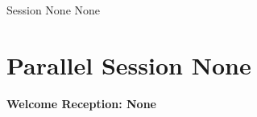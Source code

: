 \clearpage
{}
\begin{ThreeSessionOverview}{Session None}{\daydateyear}
  {None}
\end{ThreeSessionOverview}

\newpage
\section*{Parallel Session None}
{\bfseries\large Welcome Reception: None}\\
\TrackALoc\hfill\sessionchair{}{}
\clearpage


